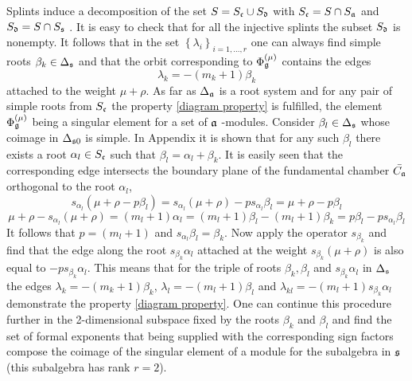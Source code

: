 \documentclass[12pt]{article}
\begin{document}
Splints induce a decomposition of the set $S=S_{\frak{c}}\cup S_{\frak{d}}$
with $S_{\frak{c}}=S\cap S_{\frak{a}}$ and $S_{\frak{d}}=S\cap S_{\frak{s}}$%
. It is easy to check that for all the injective splints the subset $S_{%
\frak{d}}$ is nonempty. It follows that in the set $\left\{ \lambda
_{i}\right\} _{i=1,\dots ,r}$ one can always find simple roots $\beta
_{k}\in \Delta _{\frak{s}}$ and that the orbit corresponding to $\Phi _{%
\frak{g}}^{\left( \mu \right) }$ contains the edges
\begin{equation}
\lambda _{k}=-\left( m_{k}+1\right) \beta _{k}  \label{beta edge}
\end{equation}
attached to the weight $\mu +\rho $. As far as $\Delta _{\frak{a}}$ is a
root system and for any pair of simple roots from $S_{\frak{c}}$ the
property \ref{diagram property} is fulfilled, the element $\Phi _{\frak{g}%
}^{\left( \mu \right) }$ being a singular element for a set of $\frak{a}$%
-modules. Consider $\beta _{l}\in \Delta _{\frak{s}}$ whose coimage in $%
\Delta _{\frak{s}0}$ is simple. In Appendix it is shown that for any such $%
\beta _{l}$ there exists a root $\alpha _{l}\in S_{\frak{c}}$ such that
$\beta _{l}=\alpha _{l}+\beta _{k}$. It is easily seen that the
corresponding edge intersects the boundary plane of the fundamental chamber $%
\bar{C_{\frak{a}}}$ orthogonal to the root $\alpha _{l}$,
\begin{equation}
s_{\alpha _{l}}\left( \mu +\rho -p\beta _{l}\right) =s_{\alpha _{l}}\left(
\mu +\rho \right) -ps_{\alpha _{l}}\beta _{l}=\mu +\rho -p\beta _{l}
\label{intersection}
\end{equation}
\begin{equation}
\mu +\rho -s_{\alpha _{l}}\left( \mu +\rho \right) =\left( m_{l}+1\right)
\alpha _{l}=\left( m_{l}+1\right) \beta _{l}-\left( m_{l}+1\right) \beta
_{k}=p\beta _{l}-ps_{\alpha _{l}}\beta _{l}  \label{intersection-2}
\end{equation}
It follows that $p=\left( m_{l}+1\right) $ and $s_{\alpha _{l}}\beta
_{l}=\beta _{k}$. Now apply the operator $s_{\beta _{k}}$ and find that the
edge along the root $s_{\beta _{k}}\alpha _{l}$ attached at the weight $%
s_{\beta _{k}}(\mu +\rho )$ is also equal to $-ps_{\beta _{k}}\alpha _{l}$.
This means that for the triple of roots $\beta _{k},\beta _{l}$ and $%
s_{\beta _{k}}\alpha _{l}$ in $\Delta _{\frak{s}}$ the edges $\lambda
_{k}=-\left( m_{k}+1\right) \beta _{k}$, $\lambda _{l}=-\left(
m_{l}+1\right) \beta _{l}$ and $\lambda _{kl}=-\left( m_{l}+1\right)
s_{\beta _{k}}\alpha _{l}$ demonstrate the property \ref{diagram property}.
One can continue this procedure further in the 2-dimensional subspace fixed
by the roots $\beta _{k}$ and $\beta _{l}$ and find the set of formal
exponents that being supplied with the corresponding sign factors compose
the coimage of the singular element of a module for the subalgebra in $\frak{%
s}$ (this subalgebra has rank $r=2$).
\end{document}
